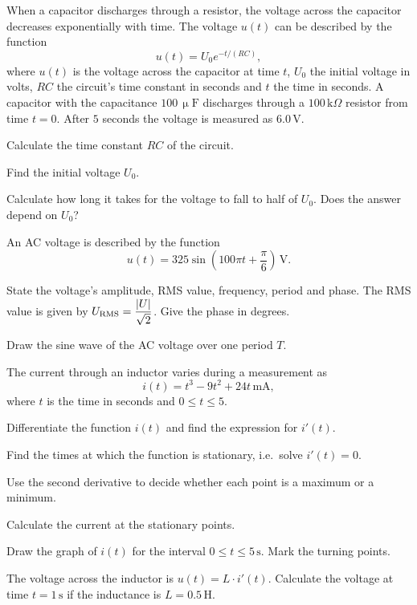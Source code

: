 When a capacitor discharges through a resistor, the voltage across the capacitor decreases
exponentially with time. The voltage $u(t)$ can be described by the function
\[
  u(t) = U_0 e^{-t/(RC)},
\]
where $u(t)$ is the voltage across the capacitor at time $t$, $U_0$ the initial voltage in volts,
$RC$ the circuit's time constant in seconds and $t$ the time in seconds. A capacitor with the
capacitance $100\,\upmu\text{F}$ discharges through a $100\,\text{k}\Omega$ resistor from time
$t = 0$. After $5$ seconds the voltage is measured as $6.0\,\text{V}$.
\begin{parts}
  \item Calculate the time constant $RC$ of the circuit.
  \item Find the initial voltage $U_0$.
  \item Calculate how long it takes for the voltage to fall to half of $U_0$. Does the answer
    depend on $U_0$?
\end{parts}

An AC voltage is described by the function
\[
  u(t) = 325\sin\left(100\pi t + \frac{\pi}{6}\right)\,\text{V}.
\]
\begin{parts}
  \item State the voltage's amplitude, RMS value, frequency, period and phase. The RMS value is
    given by $U_{\text{RMS}} = \dfrac{\lvert U\rvert}{\sqrt{2}}$. Give the phase in degrees.
  \item Draw the sine wave of the AC voltage over one period $T$.
\end{parts}

The current through an inductor varies during a measurement as
\[
  i(t) = t^3 - 9t^2 + 24t\,\text{mA},
\]
where $t$ is the time in seconds and $0 \leq t \leq 5$.
\begin{parts}
  \item Differentiate the function $i(t)$ and find the expression for $i'(t)$.
  \item Find the times at which the function is stationary, i.e.\ solve $i'(t) = 0$.
  \item Use the second derivative to decide whether each point is a maximum or a minimum.
  \item Calculate the current at the stationary points.
  \item Draw the graph of $i(t)$ for the interval $0 \leq t \leq 5\,\text{s}$. Mark the turning
    points.
  \item The voltage across the inductor is $u(t) = L \cdot i'(t)$. Calculate the voltage at time
    $t = 1\,\text{s}$ if the inductance is $L = 0.5\,\text{H}$.
\end{parts}


